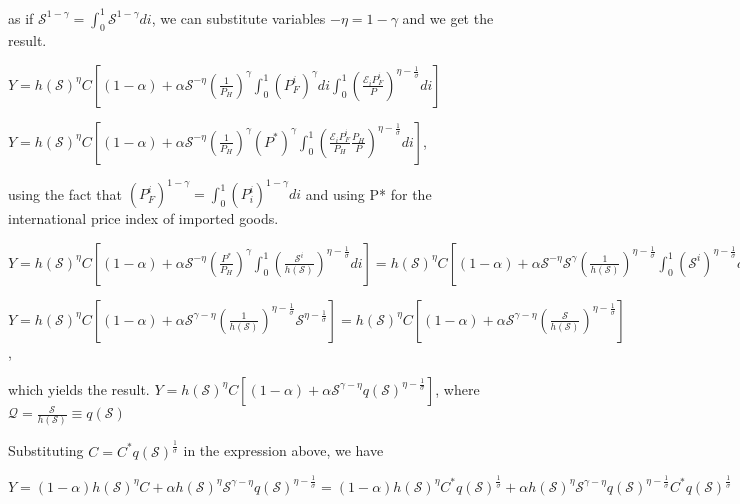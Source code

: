\documentclass[
]{article}
\begin{document}
as if
\(\displaystyle \mathcal{S}^{1-\gamma}=\int_0^1 \mathcal{S}^{1-\gamma}di\),
we can substitute variables \(-\eta=1-\gamma\) and we get the result.

\(\displaystyle Y = h(\mathcal{S})^{\eta}C \left[ (1-\alpha) + \alpha \mathcal{S}^{-\eta} \left( \frac{1}{P_H} \right)^{\gamma} \int_0^1 \left( P_F^i \right)^{\gamma} di \int_0^1 \left( \frac{\mathcal{E}_i P_F^i}{P} \right)^{\eta-\frac{1}{\sigma}} di \right]\)

\(\displaystyle Y= h(\mathcal{S})^{\eta}C \left[ (1-\alpha) + \alpha \mathcal{S}^{-\eta} \left( \frac{1}{P_H} \right)^{\gamma} (P^*)^{\gamma} \int_0^1 \left( \frac{\mathcal{E}_i P_F^i}{P_H} \frac{P_H}{P} \right)^{\eta-\frac{1}{\sigma}} di \right]\),

using the fact that
\(\left( P_F^i \right)^{1-\gamma} = \displaystyle \int_0^1 \left( P_i^i \right)^{1-\gamma}di\)
and using P* for the international price index of imported goods.

\(\displaystyle Y = h(\mathcal{S})^{\eta}C \left[ (1-\alpha) + \alpha \mathcal{S}^{-\eta} \left( \frac{P^*}{P_H} \right)^{\gamma} \int_0^1 \left( \frac{\mathcal{S}^i}{h(\mathcal{S})} \right)^{\eta-\frac{1}{\sigma}} di \right] =h(\mathcal{S})^{\eta}C \left[ (1-\alpha) + \alpha \mathcal{S}^{-\eta} \mathcal{S}^\gamma \left( \frac{1}{h(\mathcal{S})} \right)^{\eta-\frac{1}{\sigma}} \int_0^1 ( \mathcal{S}^i )^{\eta-\frac{1}{\sigma}} di \right]\)

\(\displaystyle Y = h(\mathcal{S})^{\eta}C \left[ (1-\alpha) + \alpha \mathcal{S}^{\gamma-\eta} \left( \frac{1}{h(\mathcal{S})} \right)^{\eta-\frac{1}{\sigma}} \mathcal{S} ^{\eta-\frac{1}{\sigma}} \right] = h(\mathcal{S})^{\eta}C \left[ (1-\alpha) + \alpha \mathcal{S}^{\gamma-\eta} \left( \frac{\mathcal{S}}{h(\mathcal{S})} \right)^{\eta-\frac{1}{\sigma}} \right]\),

which yields the result.
\(\displaystyle Y= h(\mathcal{S})^{\eta}C \left[ (1-\alpha) + \alpha \mathcal{S}^{\gamma-\eta} q(\mathcal{S})^{\eta-\frac{1}{\sigma}} \right]\),
where
\(\displaystyle \mathcal{Q}=\frac{\mathcal{S}}{h(\mathcal{S})} \equiv q(\mathcal{S})\)

Substituting \(\displaystyle C = C^*q(\mathcal{S})^\frac{1}{\sigma}\) in
the expression above, we have

\(\displaystyle Y= (1-\alpha)h(\mathcal{S})^{\eta}C + \alpha h(\mathcal{S})^{\eta} \mathcal{S}^{\gamma-\eta} q(\mathcal{S})^{\eta-\frac{1}{\sigma}} = (1-\alpha)h(\mathcal{S})^{\eta} C^*q(\mathcal{S})^\frac{1}{\sigma} + \alpha h(\mathcal{S})^{\eta} \mathcal{S}^{\gamma-\eta} q(\mathcal{S})^{\eta-\frac{1}{\sigma}} C^*q(\mathcal{S})^\frac{1}{\sigma}\)
\end{document}
